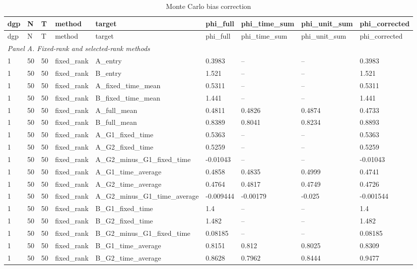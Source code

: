 \begingroup
\small
\begin{longtable}{lllllllll}
\caption{Monte Carlo bias correction}\label{tab:mc-bias-correction}\\
\toprule
dgp & N & T & method & target & phi\_full & phi\_time\_sum & phi\_unit\_sum & phi\_corrected \\
\midrule
\endfirsthead
\toprule
dgp & N & T & method & target & phi\_full & phi\_time\_sum & phi\_unit\_sum & phi\_corrected \\
\midrule
\endhead
\multicolumn{9}{l}{\textit{Panel A. Fixed-rank and selected-rank methods}} \\
1 & 50 & 50 & fixed\_rank & A\_entry & 0.3983 & -- & -- & 0.3983 \\
1 & 50 & 50 & fixed\_rank & B\_entry & 1.521 & -- & -- & 1.521 \\
1 & 50 & 50 & fixed\_rank & A\_fixed\_time\_mean & 0.5311 & -- & -- & 0.5311 \\
1 & 50 & 50 & fixed\_rank & B\_fixed\_time\_mean & 1.441 & -- & -- & 1.441 \\
1 & 50 & 50 & fixed\_rank & A\_full\_mean & 0.4811 & 0.4826 & 0.4874 & 0.4733 \\
1 & 50 & 50 & fixed\_rank & B\_full\_mean & 0.8389 & 0.8041 & 0.8234 & 0.8893 \\
1 & 50 & 50 & fixed\_rank & A\_G1\_fixed\_time & 0.5363 & -- & -- & 0.5363 \\
1 & 50 & 50 & fixed\_rank & A\_G2\_fixed\_time & 0.5259 & -- & -- & 0.5259 \\
1 & 50 & 50 & fixed\_rank & A\_G2\_minus\_G1\_fixed\_time & -0.01043 & -- & -- & -0.01043 \\
1 & 50 & 50 & fixed\_rank & A\_G1\_time\_average & 0.4858 & 0.4835 & 0.4999 & 0.4741 \\
1 & 50 & 50 & fixed\_rank & A\_G2\_time\_average & 0.4764 & 0.4817 & 0.4749 & 0.4726 \\
1 & 50 & 50 & fixed\_rank & A\_G2\_minus\_G1\_time\_average & -0.009444 & -0.00179 & -0.025 & -0.001544 \\
1 & 50 & 50 & fixed\_rank & B\_G1\_fixed\_time & 1.4 & -- & -- & 1.4 \\
1 & 50 & 50 & fixed\_rank & B\_G2\_fixed\_time & 1.482 & -- & -- & 1.482 \\
1 & 50 & 50 & fixed\_rank & B\_G2\_minus\_G1\_fixed\_time & 0.08185 & -- & -- & 0.08185 \\
1 & 50 & 50 & fixed\_rank & B\_G1\_time\_average & 0.8151 & 0.812 & 0.8025 & 0.8309 \\
1 & 50 & 50 & fixed\_rank & B\_G2\_time\_average & 0.8628 & 0.7962 & 0.8444 & 0.9477 \\

\end{longtable}
